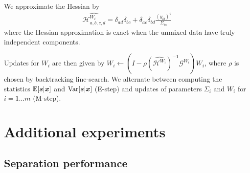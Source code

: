  We approximate the Hessian by
 \begin{align}
 \widehat{\mathcal{H}^{W_i}_{a, b, c, d}} = \delta_{ad} \delta_{bc} + \delta_{ac} \delta_{bd}\frac{(y_{ib})^2}{\Sigma_{ia}}
\end{align}
where the Hessian approximation is exact when the unmixed data have truly independent components.

Updates for $W_i$ are then given by
$W_i \leftarrow (I - \rho (\widehat{\mathcal{H}^{W_i}})^{-1} \mathcal{G}^{W_i}) W_i$, 
where $\rho$ is chosen by backtracking line-search.
We alternate between computing the statistics $\mathbb{E}[\boldsymbol{s}|\boldsymbol{x}]$ and
$\operatorname*{Var}[\boldsymbol{s}|\boldsymbol{x}]$ (E-step) and updates of parameters $\Sigma_i$ and $W_i$ for $i=1 \dots m$ (M-step).



\section{Additional experiments}
\subsection{Separation performance}
\label{app:separation}
